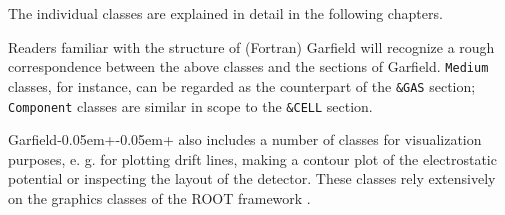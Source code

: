 The individual classes are explained in detail in the following chapters. 

Readers familiar with the structure 
of (Fortran) Garfield \cite{GarfieldFortran} will recognize a 
rough correspondence between 
the above classes and the sections of Garfield. 
\texttt{Medium} classes, for instance, can be regarded as the counterpart 
of the \texttt{\&GAS} section; 
\texttt{Component} classes are similar in 
scope to the \texttt{\&CELL} section.  
 
Garfield\kern-0.05em+\kern-0.05em+ also includes a number of classes for visualization purposes, 
e. g. for plotting drift lines, making a contour plot of the electrostatic 
potential or inspecting the layout of the detector.   
These classes rely extensively on the graphics classes of the 
ROOT framework \cite{ROOT}.

